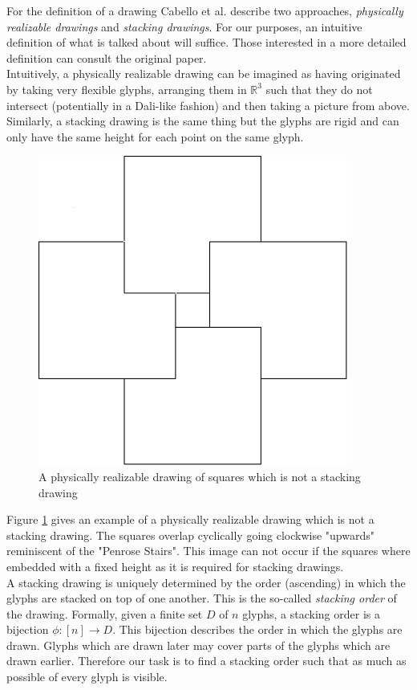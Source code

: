 \documentclass[a4paper,11pt]{article}
\begin{document}
For the definition of a drawing Cabello et al. describe two approaches, \textit{physically realizable drawings} and \textit{stacking drawings}. For our purposes, an intuitive definition of what is talked about will suffice. Those interested in a more detailed definition can consult the original paper.\\

Intuitively, a physically realizable drawing can be imagined as having originated by taking very flexible glyphs, arranging them in $\mathbb{R}^3$ such that they do not intersect  (potentially in a Dali-like fashion) and then taking a picture from above.\\
Similarly, a stacking drawing is the same thing but the glyphs are rigid and can only have the same height for each point on the same glyph.\\

%
\begin{figure}[H]
  \centering
  \includegraphics[width=0.4\linewidth]{phys_real_squares.png}
  \caption{A physically realizable drawing of squares which is not a stacking drawing}
  \label{fig:physicalSquares}
\end{figure}
%

Figure \ref{fig:physicalSquares} gives an example of a physically realizable drawing which is not a stacking drawing. The squares overlap cyclically going clockwise "upwards" reminiscent of the "Penrose Stairs". This image can not occur if the squares where embedded with a fixed height as it is required for stacking drawings.\\

A stacking drawing is uniquely determined by the order (ascending) in which the glyphs are stacked on top of one another. This is the so-called \textit{stacking order} of the drawing. Formally, given a finite set $D$ of $n$ glyphs, a stacking order is a bijection $\phi: [n]\rightarrow D$. This bijection describes the order in which the glyphs are drawn. Glyphs which are drawn later may cover parts of the glyphs which are drawn earlier. Therefore our task is to find a stacking order such that as much as possible of every glyph is visible.\\
\end{document}
